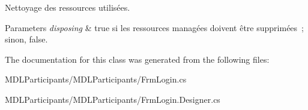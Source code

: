 Nettoyage des ressources utilisées. 


\begin{DoxyParams}{Parameters}
{\em disposing} & true si les ressources managées doivent être supprimées ; sinon, false.\\
\hline
\end{DoxyParams}


The documentation for this class was generated from the following files\+:\begin{DoxyCompactItemize}
\item 
M\+D\+L\+Participants/\+M\+D\+L\+Participants/Frm\+Login.\+cs\item 
M\+D\+L\+Participants/\+M\+D\+L\+Participants/Frm\+Login.\+Designer.\+cs\end{DoxyCompactItemize}
